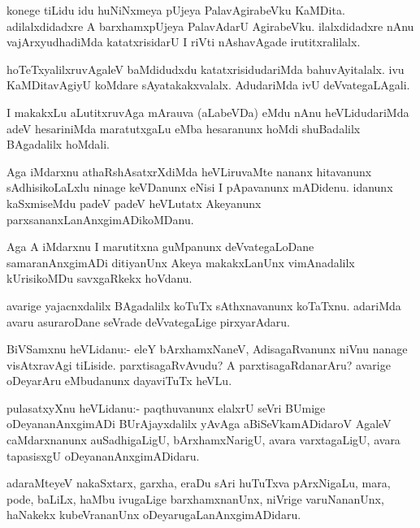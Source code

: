 \documentclass{article}
\begin{document}
\begin{mn}
konege tiLidu idu huNiNxmeya pUjeya PalavAgirabeVku
KaMDita. adilalxdidadxre A barxhamxpUjeya PalavAdarU
AgirabeVku. ilalxdidadxre nAnu vajArxyudhadiMda katatxrisidarU I riVti
nAshavAgade irutitxralilalx.
\end{mn}

\begin{mn}
hoTeTxyalilxruvAgaleV baMdidudxdu katatxrisidudariMda
bahuvAyitalalx. ivu KaMDitavAgiyU koMdare sAyatakakxvalalx. AdudariMda
ivU deVvategaLAgali.
\end{mn}

\begin{mn}
I makakxLu aLutitxruvAga mArauva (aLabeVDa) eMdu nAnu heVLidudariMda
adeV hesariniMda maratutxgaLu eMba hesaranunx hoMdi shuBadalilx
BAgadalilx hoMdali.
\end{mn}

\begin{mn}%
Aga iMdarxnu athaRshAsatxrXdiMda heVLiruvaMte nananx hitavanunx
sAdhisikoLaLxlu ninage keVDanunx eNisi I pApavanunx mADidenu. idanunx
kaSxmiseMdu padeV padeV heVLutatx Akeyanunx parxsananxLanAnxgimADikoMDanu.
\end{mn}

\begin{mn}
Aga A iMdarxnu I marutitxna guMpanunx deVvategaLoDane samaranAnxgimADi
ditiyanUnx Akeya makakxLanUnx vimAnadalilx kUrisikoMDu savxgaRkekx hoVdanu.
\end{mn}

\begin{mn}
avarige yajacnxdalilx BAgadalilx koTuTx sAthxnavanunx
koTaTxnu. adariMda avaru asuraroDane seVrade deVvategaLige pirxyarAdaru.
\end{mn}

\begin{mn}
BiVSamxnu heVLidanu:- eleY bArxhamxNaneV, AdisagaRvanunx niVnu nanage
visAtxravAgi tiLiside. parxtisagaRvAvudu? A parxtisagaRdanarAru?
avarige oDeyarAru eMbudanunx dayaviTuTx heVLu.
\end{mn}

\begin{mn}
pulasatxyXnu heVLidanu:- paqthuvanunx elalxrU seVri BUmige
oDeyananAnxgimADi BUrAjayxdalilx yAvAga aBiSeVkamADidaroV AgaleV
caMdarxnanunx auSadhigaLigU, bArxhamxNarigU, avara varxtagaLigU, avara
tapasisxgU oDeyananAnxgimADidaru.
\end{mn}

\begin{mn}
adaraMteyeV nakaSxtarx, garxha, eraDu sAri huTuTxva pArxNigaLu, mara,
pode, baLiLx, haMbu ivugaLige barxhamxnanUnx, niVrige varuNananUnx,
haNakekx kubeVrananUnx oDeyarugaLanAnxgimADidaru.
\end{mn}
\end{document}
